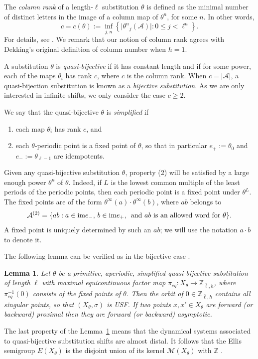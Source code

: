 \documentclass[12pt]{amsart}
\newtheorem{lemma}[theorem]{Lemma}
\theoremstyle{definition}
\numberwithin{equation}{section}
\newcommand{\Z}{\mathbb Z}
\newcommand{\pe}{\pi_{eq}}
\newcommand{\M}{\mathcal M}
\newcommand{\im}{\mbox{\rm im}}
\begin{document}
The {\em column rank} of a length-$\ell$ substitution $\theta$  is defined as the minimal number of distinct letters in the image of a column map of $\theta^{n}$, for some $n$. In other words,
\begin{equation} \label{eq:dolumnnumber}c=c (\theta) := \inf_{j,n} \left\{\lvert {\theta^n}_j(\mathcal A)\rvert  : 0\le j <  \ell^n\right\}.\end{equation} 
For details, see \cite{dekking}. We remark that our notion of column rank agrees with Dekking's original definition of column number when $h=1$.  

A substitution $\theta$ is {\em quasi-bijective} if it has constant length and if for some power,  each of the maps $\theta_i$ has rank $c$, where $c$ is the column rank. When $c=|\mathcal A|$, a quasi-bijection substitution is known as a {\em bijective substitution}. As we are only interested in infinite shifts, we only consider  the case $c\geq 2$.
 
 We say that {the quasi-bijective} $\theta$ is {\em simplified} if
 \begin{enumerate}
 \item{each map $\theta_i$ has rank $c$, and}
 \item each $\theta$-periodic point is a fixed point of $\theta$, so that in particular $e_+:=\theta_0 $ and $e_-:= \theta_{\ell-1}$ are idempotents.
  \end{enumerate}
Given any quasi-bijective substitution $\theta$, property  (2) will be satisfied by a large enough power $\theta^n$ of $\theta$. Indeed,  if $L$ is the lowest common multiple of the least periods of the periodic points, then each periodic point is a fixed point under $\theta^L$. The fixed points are of the form $\theta^{\infty}(a)\cdot\theta^{\infty}(b)$, where $ab$ belongs to 
\[ \mathcal A^{(2)} = \{ ab: a\in \im e_- ,\,   b\in \im e_+, \,  \mbox{ and } ab \mbox{ is an allowed word for $\theta$}\}.\]
A fixed point is uniquely determined by such an $ab$;  
we will use the notation $a\cdot b$ to denote it.  

The following lemma can be verified as in the bijective case \cite{ESBS}.

\begin{lemma}\label{lem:unique-singular-fibre}
Let $\theta$ be a primitive, aperiodic, simplified  quasi-bijective substitution of length $\ell$ with maximal equicontinuous factor map
$\pe:X_\theta\to\Z_{\bar{\ell},h}$, where $\pe^{-1}(0)$ consists of the fixed points of $\theta$. Then the orbit of $0\in \Z_{\bar{\ell},h}$ contains all singular points, 
so that  $(X_\theta,\sigma)$ is USF. 
If two points $x,x'\in X_\theta$ are forward (or backward) proximal then they are forward (or backward) asymptotic. 
 \end{lemma}
The last property of the Lemma~\ref{lem:unique-singular-fibre} means that the dynamical systems associated to quasi-bijective substitution shifts are almost distal.
It follows that the Ellis semigroup $E(X_\theta)$ is the disjoint union of its kernel $\M(X_\theta)$ with $\Z$ \cite{Barge-Kellendonk}.
\end{document}
